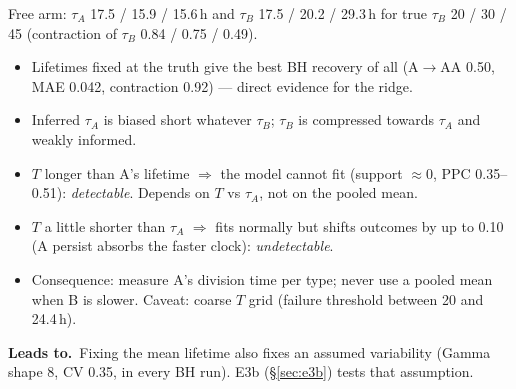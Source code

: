 \documentclass[10pt,a4paper]{article}
\newcommand{\tA}{$\tau_A$}
\newcommand{\tB}{$\tau_B$}
\newcommand{\blk}[1]{\par\needspace{5\baselineskip}\smallskip{\sffamily\bfseries\color{inkgray}#1}\par}
\newcommand{\Comment}{\blk{Comment}}
\newcommand{\Leads}[1]{\begin{leadbox}{\sffamily\bfseries\color{caqua!70!black}Leads to.}\ #1\end{leadbox}}
\renewcommand{\blk}[1]{\par\Needspace*{5\baselineskip}\smallskip{\sffamily\bfseries\color{inkgray}#1}\par}
\newcommand{\sref}[1]{\S\ref{#1}}
\begin{document}
Free arm: \tA{} 17.5 / 15.9 / 15.6\,h and \tB{} 17.5 / 20.2 / 29.3\,h for true \tB{} 20 / 30 / 45 (contraction of \tB{} 0.84 / 0.75 / 0.49).
\Comment
\begin{itemize}
\item Lifetimes fixed at the truth give the best BH recovery of all (A$\to$AA 0.50, MAE 0.042, contraction 0.92) --- direct evidence for the ridge.
\item Inferred \tA{} is biased short whatever \tB; \tB{} is compressed towards \tA{} and weakly informed.
\item $T$ longer than A's lifetime $\Rightarrow$ the model cannot fit (support $\approx 0$, PPC 0.35--0.51): \emph{detectable}. Depends on $T$ vs \tA, not on the pooled mean.
\item $T$ a little shorter than \tA{} $\Rightarrow$ fits normally but shifts outcomes by up to 0.10 (A persist absorbs the faster clock): \emph{undetectable}.
\item Consequence: measure A's division time per type; never use a pooled mean when B is slower. Caveat: coarse $T$ grid (failure threshold between 20 and 24.4\,h).
\end{itemize}
\Leads{Fixing the mean lifetime also fixes an assumed variability (Gamma shape 8, CV 0.35, in every BH run). E3b (\sref{sec:e3b}) tests that assumption.}
\end{document}

